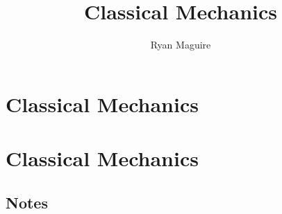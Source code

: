 \documentclass[crop=false,class=book,oneside]{standalone}
\begin{document}
    \ifx\ifphysicscourses\undefined
        \newif\ifsub
        \title{Classical Mechanics}
        \author{Ryan Maguire}
        \date{\vspace{-5ex}}
        \maketitle
        \tableofcontents
        \chapter*{Classical Mechanics}
        \setcounter{chapter}{1}
    \else
        \chapter{Classical Mechanics}
    \fi
    \section{Notes}
\end{document}
